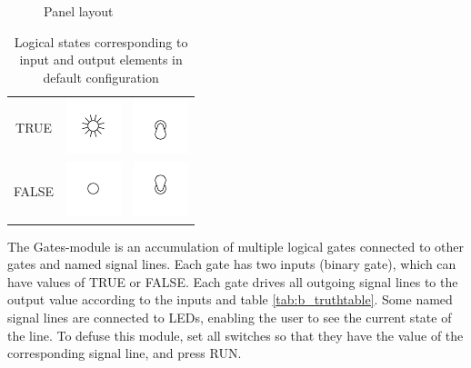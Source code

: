 \documentclass[a4paper]{report}
\author{hephaisto}
\title{\moduleTitle}
\begin{document}

\begin{figure}[t]
	\begin{center}
		\begin{tikzpicture}[scale=0.03,y=-1cm]
			
		\end{tikzpicture}
	\end{center}
	\caption{Panel layout}
	\label{fig:b_layout}
\end{figure}

\begin{table}
	\centering
	\begin{tabular}{|cm{1cm}m{1cm}|}\hline
		TRUE & \includegraphics{../common/cliparts/led_on} & \includegraphics{../common/cliparts/switch_down} \\
		FALSE & \includegraphics{../common/cliparts/led_off} & \includegraphics{../common/cliparts/switch_up} \\\hline
	\end{tabular}
	\caption{Logical states corresponding to input and output elements in default configuration}
	\label{tab:b_io_logic}
\end{table}





The Gates-module is an accumulation of multiple logical gates connected to other gates and named signal lines.
Each gate has two inputs (binary gate), which can have values of TRUE or FALSE.
Each gate drives all outgoing signal lines to the output value according to the inputs and table \ref{tab:b_truthtable}.
Some named signal lines are connected to LEDs, enabling the user to see the current state of the line.
To defuse this module, set all switches so that they have the value of the corresponding signal line, and press RUN.
\end{document}
